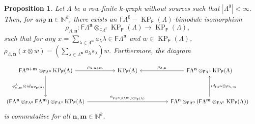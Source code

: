\documentclass[12pt]{amsart}
\newcommand{\N}{\mathbf{n}}
\newcommand{\M}{\mathbf{m}}
\newcommand{\KP}{\operatorname{KP}}
\newtheorem{prop}[thm]{Proposition}
\theoremstyle{definition}
\theoremstyle{remark}
\begin{document}
\begin{prop}\label{pro the map rho}
Let $\Lambda$ be a row-finite $k$-graph without sources such that $|\Lambda^0|<\infty$. Then, for any $\N\in \mathbb{N}^k$, there exists an $\mathsf{F}\Lambda^0-\KP_{\mathsf{F}}(\Lambda)$-bimodule isomorphism 
\[\rho_{\Lambda,\N}: \mathsf{F}\Lambda^\N\otimes_{\mathsf{F}\Lambda^0}\KP_\mathsf{F}(\Lambda)\longrightarrow \KP_\mathsf{F}(\Lambda),\] such that for any $x=\displaystyle{\sum_{\lambda\in \Lambda^\N}}a_\lambda \lambda\in \mathsf{F}\Lambda^\N$ and $w\in \KP_\mathsf{F}(\Lambda)$, $\rho_{\Lambda,\N}(x\otimes w)=(\displaystyle{\sum_{\lambda\in \Lambda^\N}}a_\lambda s_\lambda)w$. Furthermore, the diagram

\begin{equation}\label{comd2}
\begin{tikzcd}[row sep=huge, column sep=huge]
		\mathsf{F}\Lambda^{\N+\M}\otimes_{\mathsf{F}\Lambda^0}\KP_\mathsf{F}(\Lambda) \arrow [r, "\rho_{\Lambda,\N+\M}"] \arrow [d, "\phi_{\N,\M}^\Lambda\otimes id_{\KP_\mathsf{F}(\Lambda)}"'] & \KP_\mathsf{F}(\Lambda) & \mathsf{F}\Lambda^\N\otimes_{\mathsf{F}\Lambda^0}\KP_\mathsf{F}(\Lambda) \arrow [l, "\rho_{\Lambda,\N}"'] \\
		(\mathsf{F}\Lambda^\N\otimes_{\mathsf{F}\Lambda^0}\mathsf{F}\Lambda^\M)\otimes_{\mathsf{F}\Lambda^0}\KP_\mathsf{F}(\Lambda) \arrow [rr, "\alpha_{_{\mathsf{F}\Lambda^\N,\mathsf{F}\Lambda^\M,\KP_\mathsf{F}(\Lambda)}}"] && \mathsf{F}\Lambda^\N\otimes_{\mathsf{F}\Lambda^0}(\mathsf{F}\Lambda^\M\otimes_{\mathsf{F}\Lambda^0}\KP_\mathsf{F}(\Lambda)) \arrow [u, "id_{\mathsf{F}\Lambda^\N}\otimes \rho_{\Lambda,\M}"']
\end{tikzcd} 
\end{equation}
is commutative for all $\N,\M\in \mathbb{N}^k$. 
\end{prop}
\end{document}
